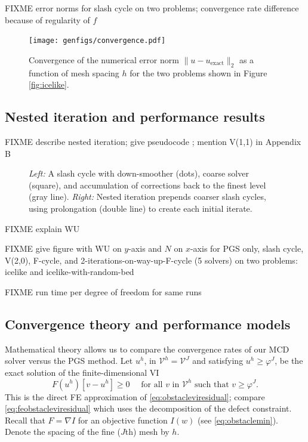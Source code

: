 \documentclass[letterpaper,final,12pt,reqno]{amsart}
\theoremstyle{claim}
\newcommand{\grad}{\nabla}
\numberwithin{equation}{section}
\numberwithin{figure}{section}
\numberwithin{table}{section}
\numberwithin{theorem}{section}
\begin{document}
FIXME error norms for slash cycle on two problems; convergence rate difference because of regularity of $f$

\begin{figure}
\texttt{[image: genfigs/convergence.pdf]}
\caption{Convergence of the numerical error norm $\|u-u_{\text{exact}}\|_2$ as a function of mesh spacing $h$ for the two problems shown in Figure \ref{fig:icelike}.}
\label{fig:convergence}
\end{figure}


\subsection*{Nested iteration and performance results} FIXME describe nested iteration; give pseudocode ; mention V(1,1) in Appendix B

\begin{figure}

\caption{\emph{Left:} A slash cycle with down-smoother (dots), coarse solver (square), and accumulation of corrections back to the finest level (gray line).  \emph{Right:} Nested iteration prepends coarser slash cycles, using prolongation (double line) to create each initial iterate.}
\label{fig:fcycle}
\end{figure}

FIXME explain WU

FIXME give figure with WU on $y$-axis and $N$ on $x$-axis for PGS only, slash cycle, V(2,0), F-cycle, and 2-iterations-on-way-up-F-cycle (5 solvers) on two problems: icelike and icelike-with-random-bed

FIXME run time per degree of freedom for same runs

\subsection*{Convergence theory and performance models}  Mathematical theory allows us to compare the convergence rates of our MCD solver versus the PGS method.  Let $u^h$, in $\mathcal{V}^h = \mathcal{V}^J$ and satisfying $u^h \ge \varphi^J$, be the exact solution of the finite-dimensional VI
\begin{equation}
  F(u^h)[v-u^h] \ge 0 \quad \text{ for all } v \text{ in $\mathcal{V}^h$ such that } v \ge \varphi^J. \label{eq:feobstaclevioriginal}
\end{equation}
This is the direct FE approximation of \eqref{eq:obstacleviresidual}; compare \eqref{eq:feobstacleviresidual} which uses the decomposition of the defect constraint.  Recall that $F=\grad I$ for an objective function $I(w)$ (see \eqref{eq:obstaclemin}).  Denote the spacing of the fine ($J$th) mesh by $h$.
\end{document}
